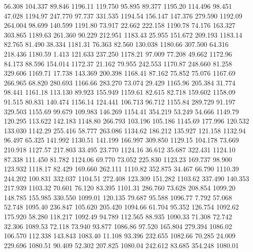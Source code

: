   56.308  104.337   89.846      1196.11
 119.750   95.895   89.377      1195.20
 114.496   98.451   47.028      1194.97
 247.770   97.737  331.535      1194.54
 156.147  147.376  279.590      1192.09
 264.004   98.699  140.599      1191.80
  73.917   22.662  222.158      1190.78
  74.176  163.327  303.865      1189.63
 261.360   90.229  212.951      1183.43
  25.955  151.672  209.193      1183.14
  82.765   81.490   38.334      1181.31
  76.363   82.560  130.038      1180.66
 307.500   64.316  218.436      1180.59
   1.413  121.633  237.250      1178.21
  97.009   77.208   49.662      1172.96
  84.173   88.596  154.014      1172.37
  21.162   79.955  242.553      1170.87
 248.660   81.258  329.606      1169.71
  17.738  143.369  200.398      1168.41
  87.162   75.852   75.076      1167.69
 266.965   68.820  280.693      1166.66
 283.270   73.074   29.429      1165.96
 205.384   31.774   98.441      1161.18
 113.130   89.923  155.949      1159.61
  82.615   82.718  159.602      1158.09
  91.515   80.831  140.474      1156.14
 124.441  106.713   96.712      1155.84
 289.729   91.197  329.503      1155.69
  99.679  109.983  146.269      1154.41
 354.219   53.249   54.666      1149.79
 120.295  113.622  142.183      1148.80
 266.793  103.196  105.186      1145.69
 177.996  120.532  133.030      1142.29
 255.416   58.777  263.086      1134.62
 186.212  135.927  121.158      1132.94
  96.497   65.325  141.992      1130.51
 141.199  166.997  309.850      1129.15
 104.178   73.669  210.918      1127.57
 217.803   33.495   23.770      1124.16
  36.612   35.687  322.431      1124.10
  87.338  111.450   81.782      1124.06
  69.770   73.052  225.830      1123.23
 169.737   98.900  123.932      1118.17
  82.429  169.660  262.111      1110.82
 352.875   34.467   66.790      1110.39
 244.202  100.831  332.037      1104.51
 272.408  123.309  151.282      1103.62
 337.490  140.353  217.939      1103.32
  70.601   76.120   83.395      1101.31
 286.760   73.628  208.854      1099.20
 148.785  155.985  330.550      1099.01
 120.135   79.687   95.588      1096.77
   7.792   57.068   52.748      1095.40
 236.847  105.620  205.420      1094.66
  61.704   95.352  126.754      1092.62
 175.920   58.280  118.217      1092.49
  94.789  112.565   88.935      1090.33
  71.308   72.742   32.306      1089.53
  72.118   73.940   93.877      1086.86
  97.520  165.804  279.394      1086.02
 106.570  112.338  143.843      1083.40
  11.108   93.396  232.655      1082.66
  70.285   24.009  229.696      1080.51
  90.409   52.302  207.825      1080.04
 242.612   83.685  354.248      1080.01
